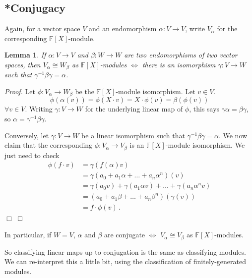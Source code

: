 \documentclass{article}
\theoremstyle{plain}\theoremheaderfont{\normalfont\itshape}\theorembodyfont{\rmfamily}\theoremseparator{.}\newtheorem*{rem}{Remark}\newtheorem*{ex}{Example}\newtheorem*{proof}{Proof}\newtheorem*{altp}{Alternative proof}\newtheorem*{nonex}{Non-Example}
\theoremstyle{plain}\theoremheaderfont{\normalfont\bfseries}\theorembodyfont{\rmfamily}\theoremseparator{.}\newtheorem{thm}{Theorem}[section]\newtheorem{lem}[thm]{Lemma}\newtheorem{prop}[thm]{Proposition}\newtheorem*{cor}{Corollary}\newtheorem{defn}[thm]{Definition}\newtheorem{clm}[thm]{Claim}\newtheorem{clminproof}{Claim}\newtheorem*{notn}{Notation}\newtheorem*{exer}{Exercise}\newtheorem*{lemnn}{Lemma}
\theoremstyle{break}\theoremheaderfont{\normalfont\itshape}\theorembodyfont{\rmfamily}\theoremseparator{.\medskip}\newtheorem*{proofskip}{Proof}\newtheorem*{exs}{Examples}\newtheorem*{rems}{Remarks}\newtheorem*{obs}{Observations}
\theoremstyle{break}\theoremheaderfont{\normalfont\bfseries}\theorembodyfont{\rmfamily}\theoremseparator{.\medskip}\newtheorem{lemskip}[thm]{Lemma}\newtheorem{defnskip}[thm]{Definition}\newtheorem{propskip}[thm]{Proposition}\newtheorem{thmskip}[thm]{Theorem}
\numberwithin{equation}{section}
\newcommand{\qed}{\hfill\ensuremath{\Box}}
\newcommand{\FF}{\mathbb{F}}
\begin{document}
    \subsection{*Conjugacy}
    Again, for a vector space \(V\) and an endomorphism \(\alpha:V\to V\), write \(V_\alpha\) for the corresponding \(\FF[X]\)-module.
    \begin{lem}
        If \(\alpha:V\to V\) and \(\beta:W\to W\) are two endomorphisms of two vector spaces, then \(V_\alpha\cong W_\beta\) as \(\FF[X]\)-modules \(\iff\) there is an isomorphism \(\gamma:V\to W\) such that \(\gamma^{-1}\beta\gamma=\alpha\).
    \end{lem}
    \begin{proof}
        Let \(\phi:V_\alpha\to W_\beta\) be the \(\FF[X]\)-module isomorphism. Let \(v\in V\).
        \[\phi(\alpha(v))=\phi(X\cdot v)=X\cdot\phi(v)=\beta(\phi(v))\]
        \(\forall v\in V\). Writing \(\gamma:V\to W\) for the underlying linear map of \(\phi\), this says \(\gamma\alpha=\beta\gamma\), so \(\alpha=\gamma^{-1}\beta\gamma\).
        
        Conversely, let \(\gamma:V\to W\) be a linear isomorphism such that \(\gamma^{-1}\beta\gamma=\alpha\). We now claim that the corresponding \(\phi:V_\alpha\to V_\beta\) is an \(\FF[X]\)-module isomorphism. We just need to check
        \begin{align*}
            \phi(f\cdot v)&=\gamma(f(\alpha)v)\\
            &=\gamma(a_0+a_1\alpha+\dots+a_n\alpha^n)(v)\\
            &=\gamma(a_0v)+\gamma(a_1\alpha v)+\dots+\gamma(a_n\alpha^n v)\\
            &=(a_0+a_1\beta+\dots+a_n\beta^n)(\gamma(v))\\
            &=f\cdot\phi(v)\,.
        \end{align*}\qed
    \end{proof}
    In particular, if \(W=V\), \(\alpha\) and \(\beta\) are conjugate \(\iff\) \(V_\alpha\cong V_\beta\) as \(\FF[X]\)-modules.

    So classifying linear maps up to conjugation is the same as classifying modules. We can re-interpret this a little bit, using the classification of finitely-generated modules.
\end{document}
